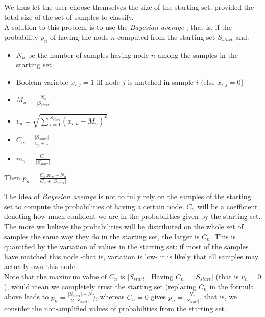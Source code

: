 \documentclass{report}
\begin{document}
We thus let the user choose themselves the size of the starting set, provided the total size of the set of samples to classify.\\

A solution to this problem is to use the \emph{Bayesian average} \cite{BayesianRating}, that is, if the probability $p_{n}$ of having the node $n$ computed from the starting set $S_{start}$ and:

\begin{itemize}
\item $N_{n}$ be the number of samples having node $n$ among the samples in the starting set
\item Boolean variable $x_{i,j} = 1$ iff node $j$ is matched in sample $i$ (else $x_{i,j} = 0$)
\item $M_{n} = \frac{N_{n}}{|S_{start}|}$ 
\item $v_{n} = \sqrt{\sum{_{i=1}^{S_{start}}}{(x_{i,n} - M_{n})^{2}}}$
\item $C_{n} = \frac{|S_{start}|}{v_{n} + 1}$
\item $m_{n} = \frac{C_{n}}{|S_{start}|}$
\end{itemize}

\begin{center}
Then $p_{n} = \frac{C_{n}.m_{n} + N_{n}}{C_{n} + |S_{start}|}$\\
\end{center}

The idea of \emph{Bayesian average} is not to fully rely on the samples of the starting set to compute the probabilities of having a certain node. $C_{n}$ will be a coefficient denoting how much confident we are in the probabilities given by the starting set. The more we believe the probabilities will be distributed on the whole set of samples the same way they do in the starting set, the larger is $C_{n}$. This is quantified by the variation of values in the starting set: if most of the samples have matched this node -that is, variation is low- it is likely that all samples may actually own this node.\\

Note that the maximum value of $C_{n}$ is $|S_{start}|$. Having $C_{n} = |S_{start}|$ (that is $v_{n} = 0$), would mean we completely trust the starting set (replacing $C_{n}$ in the formula above leads to $p_{n} = \frac{|S_{start}| + N}{2.|S_{start}|}$), whereas $C_{n} = 0$ gives $p_{n} = \frac{N_{n}}{|S_{start}|}$, that is, we consider the non-amplified values of probabilities from the starting set.\\
\end{document}
